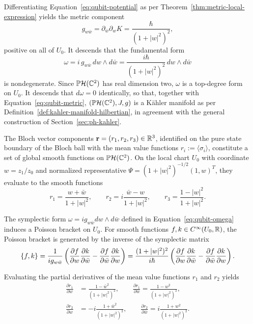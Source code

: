 \noindent Differentiating Equation~\eqref{eq:qubit-potential} as per Theorem~\ref{thm:metric-local-expression} yields the metric component
\begin{equation}
	g_{w\bar w}=\partial_{\bar w}\partial_w K=\frac{\hbar}{(1+|w|^2)^2}, \label{eq:qubit-metric}
\end{equation}
positive on all of $U_0$. It descends that the fundamental form
\begin{equation}
	\boxed{\omega=i\,g_{w\bar w}\,dw\wedge d\bar w=\frac{i\hbar}{(1+|w|^2)^2}\,dw\wedge d\bar w} \label{eq:qubit-omega}
\end{equation}
is nondegenerate. Since $\PH(\C^2)$ has real dimension two, $\omega$ is a top-degree form on $U_0$. It descends that $d\omega=0$ identically, so that, together with Equation~\eqref{eq:qubit-metric}, $(\PH(\C^2),J,g)$ is a Kähler manifold as per Definition~\ref{def:kahler-manifold-hilbertian}, in agreement with the general construction of Section~\ref{sec:ph-kahler}.

\noindent The Bloch vector components $\mathbf{r}=(r_1,r_2,r_3) \in \mathbb{R}^3$, identified on the pure state boundary of the Bloch ball with the mean value functions $r_i := \langle\sigma_i\rangle$,  constitute a set of global smooth functions on $\PH(\mathbb{C}^2)$. On the local chart $U_0$ with coordinate $w = z_1/z_0$ and normalized representative $\Psi = (1+|w|^2)^{-1/2} (1, w)^T$, they evaluate to the smooth functions
\begin{equation}
	r_1 = \frac{w + \bar{w}}{1+|w|^2}, \qquad r_2 = i\frac{\bar{w} - w}{1+|w|^2}, \qquad r_3 = \frac{1 - |w|^2}{1+|w|^2}.
\end{equation}

\noindent The symplectic form $\omega = i g_{w\bar{w}} dw \wedge d\bar{w}$ defined in Equation~\eqref{eq:qubit-omega} induces a Poisson bracket on $U_0$. For smooth functions $f, k \in C^\infty(U_0, \mathbb{R})$, the Poisson bracket is generated by the inverse of the symplectic matrix
\begin{equation}
	\{f,k\} = \frac{1}{i g_{w\bar{w}}} \left( \frac{\partial f}{\partial w} \frac{\partial k}{\partial \bar{w}} - \frac{\partial f}{\partial \bar{w}} \frac{\partial k}{\partial w} \right) = \frac{(1+|w|^2)^2}{i\hbar} \left( \frac{\partial f}{\partial w} \frac{\partial k}{\partial \bar{w}} - \frac{\partial f}{\partial \bar{w}} \frac{\partial k}{\partial w} \right).
\end{equation}

\noindent Evaluating the partial derivatives of the mean value functions $r_1$ and $r_2$ yields
\begin{align}
	\frac{\partial r_1}{\partial w} &= \frac{1 - \bar{w}^2}{(1+|w|^2)^2}, \qquad \frac{\partial r_1}{\partial \bar{w}} = \frac{1 - w^2}{(1+|w|^2)^2}, \\
	\frac{\partial r_2}{\partial w} &= -i\frac{1 + \bar{w}^2}{(1+|w|^2)^2}, \qquad \frac{\partial r_2}{\partial \bar{w}} = i\frac{1 + w^2}{(1+|w|^2)^2}.
\end{align}

